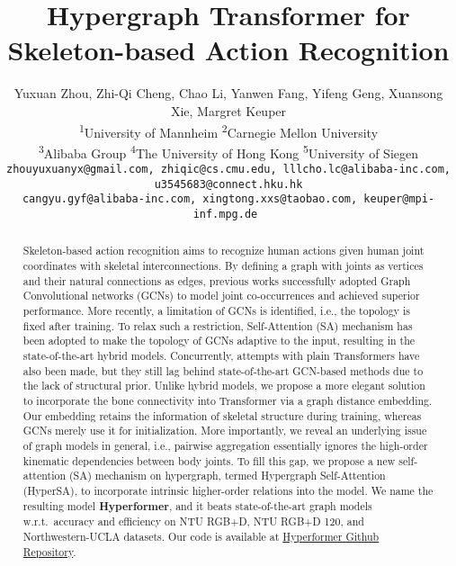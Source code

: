 \documentclass[10pt,twocolumn,letterpaper]{article}
\begin{document}
\title{Hypergraph Transformer for Skeleton-based Action Recognition}




\author{Yuxuan Zhou\textsuperscript{},
Zhi-Qi Cheng\textsuperscript{},
Chao Li\textsuperscript{},
Yanwen Fang\textsuperscript{},
Yifeng Geng\textsuperscript{},
Xuansong Xie\textsuperscript{},
Margret Keuper\textsuperscript{}\\
\textsuperscript{1}{University of Mannheim}
\textsuperscript{2}{Carnegie Mellon University}\\
\textsuperscript{3}{Alibaba Group}
\textsuperscript{4}{The University of Hong Kong}
\textsuperscript{5}{University of Siegen}\\
{\tt \small zhouyuxuanyx@gmail.com, zhiqic@cs.cmu.edu,
lllcho.lc@alibaba-inc.com, u3545683@connect.hku.hk}\\
{\tt \small cangyu.gyf@alibaba-inc.com, xingtong.xxs@taobao.com,
keuper@mpi-inf.mpg.de
}
}


\maketitle
\ificcvfinal\thispagestyle{empty}\fi

\begin{abstract}
Skeleton-based action recognition aims to recognize human actions given human joint coordinates with skeletal interconnections.
By defining a graph with joints as vertices and their natural connections as edges, previous works successfully adopted Graph Convolutional networks (GCNs) to model joint co-occurrences and achieved superior performance. More recently, a limitation of GCNs is identified, i.e., the topology is fixed after training. To relax such a restriction, Self-Attention (SA) mechanism has been adopted to make the topology of GCNs adaptive to the input, resulting in the state-of-the-art hybrid models. Concurrently, attempts with plain Transformers have also been made, but they still lag behind state-of-the-art GCN-based methods due to the lack of structural prior. Unlike hybrid models, we propose a more elegant solution to incorporate the bone connectivity into Transformer via a graph distance embedding. Our embedding retains the information of skeletal structure during training, whereas GCNs merely use it for initialization. 
More importantly, we reveal an underlying issue of graph models in general, i.e., pairwise aggregation essentially ignores the high-order kinematic dependencies between body joints. 
To fill this gap, we propose a new self-attention (SA) mechanism on hypergraph, termed Hypergraph Self-Attention (HyperSA), to incorporate intrinsic higher-order relations into the model. 
We name the resulting model \textbf{Hyperformer}, and it beats state-of-the-art graph models w.r.t.~accuracy and efficiency on NTU RGB+D, NTU RGB+D 120, and Northwestern-UCLA datasets. Our code is available at \href{https://github.com/ZhouYuxuanYX/Hypergraph-Transformer-for-Skeleton-based-Action-Recognition}{Hyperformer Github Repository}.
\end{abstract}
\end{document}
